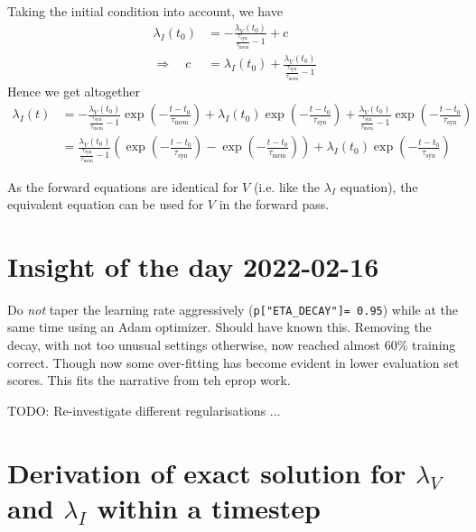 \documentclass[a4paper]{article}
\begin{document}
Taking the initial condition into account, we have
\begin{align}
  \lambda_I(t_0) &= -\frac{\lambda_V(t_0)}{\frac{\tau_{\text{syn}}}{\tau_{\text{mem}}} -1} + c \\
  \Rightarrow \quad c &= \lambda_I(t_0) + \frac{\lambda_V(t_0)}{\frac{\tau_{\text{syn}}}{\tau_{\text{mem}}} -1}
\end{align}
Hence we get altogether
\begin{align}
  \lambda_I(t) &= -\frac{\lambda_V(t_0)}{\frac{\tau_{\text{syn}}}{\tau_{\text{mem}}} -1} \exp\left(-\frac{t-t_0}{\tau_{\text{mem}}} \right) + \lambda_I(t_0) \exp\left(-\frac{t-t_0}{\tau_{\text{syn}}}\right) + \frac{\lambda_V(t_0)}{\frac{\tau_{\text{syn}}}{\tau_{\text{mem}}} -1} \exp\left(-\frac{t-t_0}{\tau_{\text{syn}}}\right) \\
  &= \frac{\lambda_V(t_0)}{\frac{\tau_{\text{syn}}}{\tau_{\text{mem}}} -1} \left(\exp\left(-\frac{t-t_0}{\tau_{\text{syn}}}\right) - \exp\left(-\frac{t-t_0}{\tau_{\text{mem}}} \right) \right) + \lambda_I(t_0) \exp\left(-\frac{t-t_0}{\tau_{\text{syn}}}\right)
\end{align}

As the forward equations are identical for $V$ (i.e. like the $\lambda_I$ equation), the equivalent equation can be used for $V$ in the forward pass.

\section{Insight of the day 2022-02-16}
  Do {\em not} taper the learning rate aggressively (\verb+p["ETA_DECAY"]= 0.95+) while at the same time using an Adam optimizer. Should have known this. Removing the decay, with not too unusual settings otherwise, now reached almost 60\% training correct. Though now some over-fitting has become evident in lower evaluation set scores. This fits the narrative from teh eprop work.

  TODO: Re-investigate different regularisations ...

\section{Derivation of exact solution for $\lambda_V$ and $\lambda_I$
  within a timestep}
\end{document}

